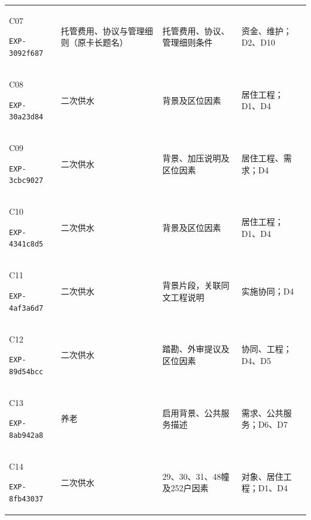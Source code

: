 {\begin{longtable}{@{}L{29mm}L{36mm}L{56mm}L{32mm}@{}}
\hypertarget{EXP-3092f687-50c6-452e-b1d1-5703c250c25e}{C07}\newline\texttt{EXP-3092f687} & 托管费用、协议与管理细则（原卡长题名） & 托管费用、协议、管理细则条件 & 资金、维护；D2、D10\\
\hypertarget{EXP-30a23d84-6fb1-43ce-af5a-02a79ee0a4b6}{C08}\newline\texttt{EXP-30a23d84} & 二次供水 & 背景及区位因素 & 居住工程；D1、D4\\
\hypertarget{EXP-3cbc9027-6c40-49c6-9767-edec50043a5f}{C09}\newline\texttt{EXP-3cbc9027} & 二次供水 & 背景、加压说明及区位因素 & 居住工程、需求；D4\\
\hypertarget{EXP-4341c8d5-94be-4abf-aaa6-46130f911157}{C10}\newline\texttt{EXP-4341c8d5} & 二次供水 & 背景及区位因素 & 居住工程；D1、D4\\
\hypertarget{EXP-4af3a6d7-54d9-4dd2-aa5c-cf3d02ddf96b}{C11}\newline\texttt{EXP-4af3a6d7} & 二次供水 & 背景片段，关联同文工程说明 & 实施协同；D4\\
\hypertarget{EXP-89d54bcc-fc1f-4431-be62-7a06bce77e41}{C12}\newline\texttt{EXP-89d54bcc} & 二次供水 & 踏勘、外审提议及区位因素 & 协同、工程；D4、D5\\
\hypertarget{EXP-8ab942a8-bdac-4075-97da-46b09ee9aa41}{C13}\newline\texttt{EXP-8ab942a8} & 养老 & 启用背景、公共服务描述 & 需求、公共服务；D6、D7\\
\hypertarget{EXP-8fb43037-0680-4136-8844-edcb789391f4}{C14}\newline\texttt{EXP-8fb43037} & 二次供水 & 29、30、31、48幢及252户因素 & 对象、居住工程；D1、D4\\

\end{longtable}}
